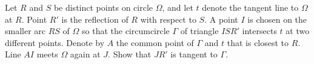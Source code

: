Let $R$ and $S$ be distinct points on circle $\Omega$, and let $t$ denote the tangent line to $\Omega$ at $R$. Point $R'$ is the reflection of $R$ with respect to $S$. A point $I$ is chosen on the smaller arc $RS$ of $\Omega$ so that the circumcircle $\Gamma$ of triangle $ISR'$ intersects $t$ at two different points. Denote by $A$ the common point of $\Gamma$ and $t$ that is closest to $R$. Line $AI$ meets $\Omega$ again at $J$. Show that $JR'$ is tangent to $\Gamma$.
